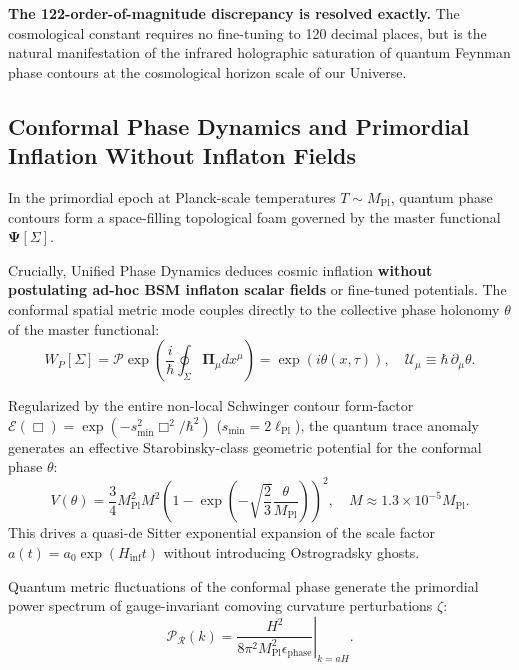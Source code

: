 \documentclass[11pt,a4paper]{article}
\theoremstyle{definition}
\begin{document}
\textbf{The 122-order-of-magnitude discrepancy is resolved exactly.}  
The cosmological constant requires no fine-tuning to 120 decimal places, but is the natural manifestation of the infrared holographic saturation of quantum Feynman phase contours at the cosmological horizon scale of our Universe.

\subsection{Conformal Phase Dynamics and Primordial Inflation Without Inflaton Fields}\label{sec:3.4}

In the primordial epoch at Planck-scale temperatures $T \sim M_{\mathrm{Pl}}$, quantum phase contours form a space-filling topological foam governed by the master functional $\mathbf{\Psi}[\Sigma]$. 

Crucially, Unified Phase Dynamics deduces cosmic inflation \textbf{without postulating ad-hoc BSM inflaton scalar fields} or fine-tuned potentials. The conformal spatial metric mode couples directly to the collective phase holonomy $\theta$ of the master functional:
\begin{equation}\label{eq:3.22a}\tag{3.22a}
W_P[\Sigma] = \mathcal{P} \exp\left( \frac{i}{\hbar} \oint_\Sigma \mathbf{\Pi}_\mu dx^\mu \right) = \exp(i \theta(x, \tau)), \quad \mathcal{U}_\mu \equiv \hbar \, \partial_\mu \theta.
\end{equation}

Regularized by the entire non-local Schwinger contour form-factor $\mathcal{E}(\Box) = \exp(-s_{\min}^2 \Box^2/\hbar^2)$ ($s_{\min} = 2\ell_{\mathrm{Pl}}$), the quantum trace anomaly generates an effective Starobinsky-class geometric potential for the conformal phase $\theta$:
\begin{equation}\label{eq:3.22}\tag{3.22}
V(\theta) = \frac{3}{4} M_{\mathrm{Pl}}^2 M^2 \left( 1 - \exp\left(-\sqrt{\frac{2}{3}}\frac{\theta}{M_{\mathrm{Pl}}}\right) \right)^2, \quad M \approx 1.3 \times 10^{-5} M_{\mathrm{Pl}}.
\end{equation}
This drives a quasi-de Sitter exponential expansion of the scale factor $a(t) = a_0 \exp(H_{\text{inf}} t)$ without introducing Ostrogradsky ghosts.

Quantum metric fluctuations of the conformal phase generate the primordial power spectrum of gauge-invariant comoving curvature perturbations $\zeta$:
\begin{equation}\label{eq:3.23}\tag{3.23}
\mathcal{P}_{\mathcal{R}}(k) = \left. \frac{H^2}{8\pi^2 M_{\mathrm{Pl}}^2 \epsilon_{\mathrm{phase}}} \right|_{k=aH}.
\end{equation}
\end{document}
